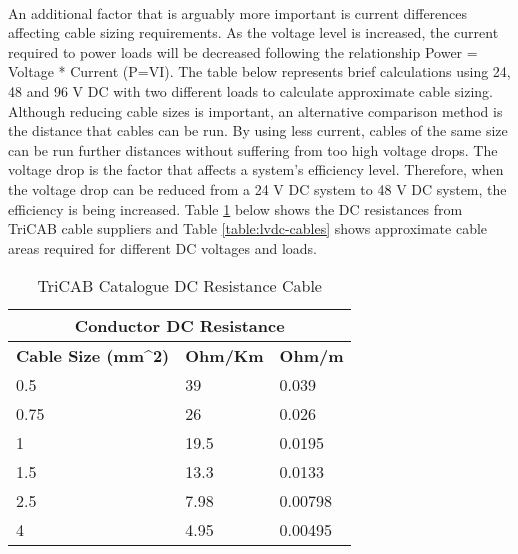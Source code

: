 \paragraph{}
An additional factor that is arguably more important is current differences affecting cable sizing requirements. As the voltage level is increased, the current required to power loads will be decreased following the relationship Power = Voltage * Current (P=VI). The table below represents brief calculations using 24, 48 and 96 V DC with two different loads to calculate approximate cable sizing. Although reducing cable sizes is important, an alternative comparison method is the distance that cables can be run. By using less current, cables of the same size can be run further distances without suffering from too high voltage drops. The voltage drop is the factor that affects a system's efficiency level. Therefore, when the voltage drop can be reduced from a 24 V DC system to 48 V DC system, the efficiency is being increased. Table \ref{table:DC-Resistances} below shows the DC resistances from TriCAB cable suppliers \cite{website:triCAB} and Table \ref{table:lvdc-cables} shows approximate cable areas required for different DC voltages and loads.

\begin{table}[H]
\centering
\begin{tabular}{|l|l|l|}
\hline
\multicolumn{3}{|c|}{\textbf{Conductor DC Resistance}}                                                                                        \\ \hline
\multicolumn{1}{|c|}{\textbf{Cable Size (mm\textasciicircum 2)}} & \multicolumn{1}{c|}{\textbf{Ohm/Km}} & \multicolumn{1}{c|}{\textbf{Ohm/m}} \\ \hline
0.5                                                              & 39                                   & 0.039                               \\ \hline
0.75                                                             & 26                                   & 0.026                               \\ \hline
1                                                                & 19.5                                 & 0.0195                              \\ \hline
1.5                                                              & 13.3                                 & 0.0133                              \\ \hline
2.5                                                              & 7.98                                 & 0.00798                             \\ \hline
4                                                                & 4.95                                 & 0.00495 \\ 
\hline     
\end{tabular}
\caption{TriCAB Catalogue DC Resistance Cable \cite{website:triCAB}}
\label{table:DC-Resistances}
\end{table}

